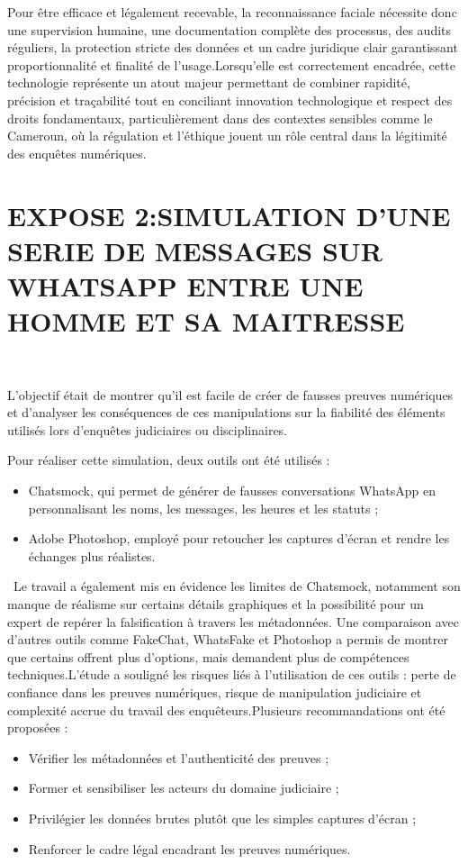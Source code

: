 \documentclass[12pt,a4paper]{report}
\begin{document}
{ 	Pour être efficace et légalement recevable, la reconnaissance faciale nécessite donc une supervision humaine, une documentation complète des processus, des audits réguliers, la protection stricte des données et un cadre juridique clair garantissant proportionnalité et finalité de l’usage.Lorsqu’elle est correctement encadrée, cette technologie représente un atout majeur  permettant de combiner rapidité, précision et traçabilité tout en conciliant innovation technologique et respect des droits fondamentaux, particulièrement dans des contextes sensibles comme le Cameroun, où la régulation et l’éthique jouent un rôle central dans la légitimité des enquêtes numériques.


\section*{EXPOSE 2:SIMULATION D'UNE SERIE DE MESSAGES SUR WHATSAPP ENTRE UNE HOMME ET SA MAITRESSE}\

 L’objectif était de montrer qu’il est facile de créer de fausses preuves numériques et d’analyser les conséquences de ces manipulations sur la fiabilité des éléments utilisés lors d’enquêtes judiciaires ou disciplinaires.
 
 Pour réaliser cette simulation, deux outils ont été utilisés :
\begin{itemize}
\item Chatsmock, qui permet de générer de fausses conversations WhatsApp en personnalisant les noms, les messages, les heures et les statuts ;
\item Adobe Photoshop, employé pour retoucher les captures d’écran et rendre les échanges plus réalistes.
\end{itemize}\
Le travail a également mis en évidence les limites de Chatsmock, notamment son manque de réalisme sur certains détails graphiques et la possibilité pour un expert de repérer la falsification à travers les métadonnées. Une comparaison avec d’autres outils comme FakeChat, WhatsFake et Photoshop a permis de montrer que certains offrent plus d’options, mais demandent plus de compétences techniques.L’étude a souligné les risques liés à l’utilisation de ces outils : perte de confiance dans les preuves numériques, risque de manipulation judiciaire et complexité accrue du travail des enquêteurs.Plusieurs recommandations ont été proposées :
\begin{itemize}
\item Vérifier les métadonnées et l’authenticité des preuves ;
\item Former et sensibiliser les acteurs du domaine judiciaire ;
\item Privilégier les données brutes plutôt que les simples captures d’écran ;
\item Renforcer le cadre légal encadrant les preuves numériques.
\end{itemize}

}
\end{document}
